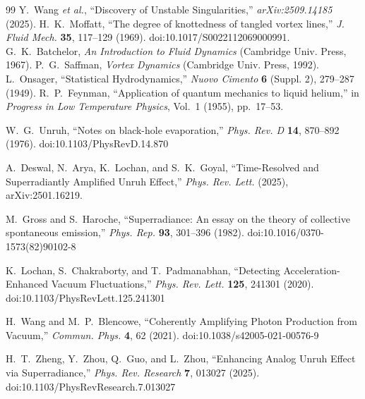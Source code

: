 \documentclass[10pt,reprint,aps,onecolumn,nofootinbib]{revtex4-2}
\begin{document}
\begin{thebibliography}{99}
        Y.~Wang \emph{et al.}, ``Discovery of Unstable Singularities,''
        \emph{arXiv:2509.14185} (2025).
        H.~K.~Moffatt, ``The degree of knottedness of tangled vortex lines,'' \emph{J. Fluid Mech.} \textbf{35}, 117--129 (1969). doi:10.1017/S0022112069000991.
        G.~K.~Batchelor, \emph{An Introduction to Fluid Dynamics} (Cambridge Univ. Press, 1967).
        P.~G.~Saffman, \emph{Vortex Dynamics} (Cambridge Univ. Press, 1992).
        L.~Onsager, ``Statistical Hydrodynamics,'' \emph{Nuovo Cimento} \textbf{6} (Suppl. 2), 279--287 (1949).
        R.~P.~Feynman, ``Application of quantum mechanics to liquid helium,'' in \emph{Progress in Low Temperature Physics}, Vol.~1 (1955), pp.~17--53.

        W.~G.~Unruh,
        ``Notes on black-hole evaporation,''
        \textit{Phys. Rev. D} \textbf{14}, 870--892 (1976).
        doi:10.1103/PhysRevD.14.870

        A.~Deswal, N.~Arya, K.~Lochan, and S.~K.~Goyal,
        ``Time-Resolved and Superradiantly Amplified Unruh Effect,''
        \textit{Phys. Rev. Lett.} (2025), arXiv:2501.16219.

        M.~Gross and S.~Haroche,
        ``Superradiance: An essay on the theory of collective spontaneous emission,''
        \textit{Phys. Rep.} \textbf{93}, 301--396 (1982).
        doi:10.1016/0370-1573(82)90102-8

        K.~Lochan, S.~Chakraborty, and T.~Padmanabhan,
        ``Detecting Acceleration-Enhanced Vacuum Fluctuations,''
        \textit{Phys. Rev. Lett.} \textbf{125}, 241301 (2020).
        doi:10.1103/PhysRevLett.125.241301

        H.~Wang and M.~P.~Blencowe,
        ``Coherently Amplifying Photon Production from Vacuum,''
        \textit{Commun. Phys.} \textbf{4}, 62 (2021).
        doi:10.1038/s42005-021-00576-9



        H.~T.~Zheng, Y.~Zhou, Q.~Guo, and L.~Zhou,
        ``Enhancing Analog Unruh Effect via Superradiance,''
        \textit{Phys. Rev. Research} \textbf{7}, 013027 (2025).
        doi:10.1103/PhysRevResearch.7.013027


\end{thebibliography}
\end{document}
